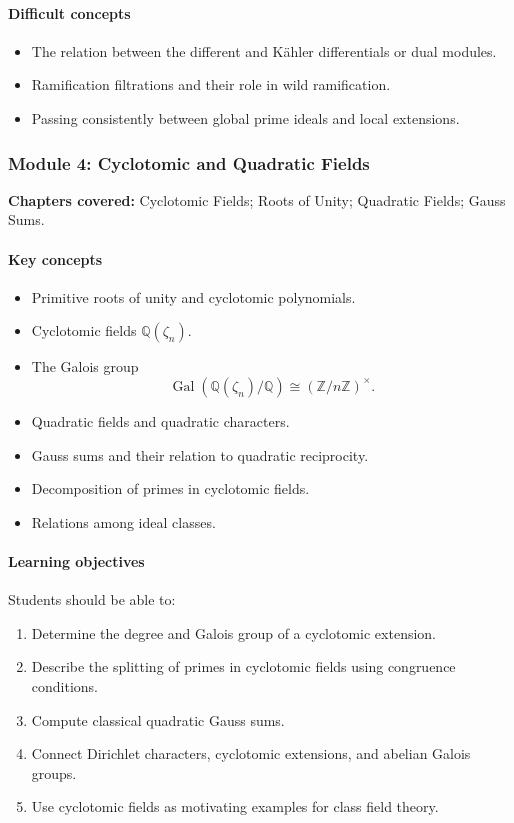 \documentclass[11pt]{article}
\newcommand{\Q}{\mathbb{Q}}
\newcommand{\Z}{\mathbb{Z}}
\newcommand{\Gal}{\operatorname{Gal}}
\begin{document}
\paragraph{Difficult concepts}
\begin{itemize}
    \item The relation between the different and K\"ahler differentials or dual modules.
    \item Ramification filtrations and their role in wild ramification.
    \item Passing consistently between global prime ideals and local extensions.
\end{itemize}

\subsubsection*{Module 4: Cyclotomic and Quadratic Fields}

\textbf{Chapters covered:} Cyclotomic Fields; Roots of Unity; Quadratic Fields; Gauss Sums.

\paragraph{Key concepts}
\begin{itemize}
    \item Primitive roots of unity and cyclotomic polynomials.
    \item Cyclotomic fields $\Q(\zeta_n)$.
    \item The Galois group
    \[
    \Gal(\Q(\zeta_n)/\Q)\cong(\Z/n\Z)^\times.
    \]
    \item Quadratic fields and quadratic characters.
    \item Gauss sums and their relation to quadratic reciprocity.
    \item Decomposition of primes in cyclotomic fields.
    \item Relations among ideal classes.
\end{itemize}

\paragraph{Learning objectives}
Students should be able to:
\begin{enumerate}
    \item Determine the degree and Galois group of a cyclotomic extension.
    \item Describe the splitting of primes in cyclotomic fields using congruence conditions.
    \item Compute classical quadratic Gauss sums.
    \item Connect Dirichlet characters, cyclotomic extensions, and abelian Galois groups.
    \item Use cyclotomic fields as motivating examples for class field theory.
\end{enumerate}
\end{document}
